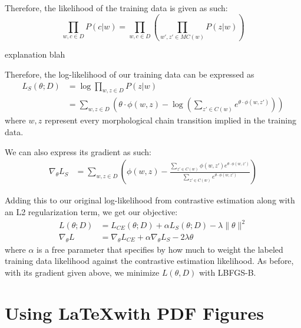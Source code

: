 \documentclass[10pt,twocolumn]{article}
\begin{document}
Therefore, the likelihood of the training data is given as such:
\begin{equation}
    \prod_{w, c \in D} P(c | w) = \prod_{w, c \in D}\left(\prod_{w', z' \in MC(w)} P(z | w)\right)
\end{equation}

explanation blah

Therefore, the log-likelihood of our training data can be expressed as
\begin{equation}
    \begin{split}
        L_S(\theta; D) &= \log{\prod_{w, z \in D} P(z|w)} \\
                     &= \sum_{w, z \in D} \left(\theta \cdot \phi(w, z) - \log\left(\sum_{z' \in C(w)} e^{\theta \cdot \phi(w, z')} \right)\right)
\end{split}
\end{equation}
where $w, z$ represent every morphological chain transition implied in the training data.

We can also express its gradient as such:
\begin{equation}
    \begin{split}
        \nabla_\theta L_S &= \sum_{w, z \in D} \left(\phi(w, z) - \frac{\sum_{z' \in C(w)} \phi(w, z') e^{\theta \cdot \phi(w, z')} }{\sum_{z' \in C(w)} e^{\theta \cdot \phi(w, z')}}\right)
    \end{split}
\end{equation}

Adding this to our original log-likelihood from contrastive estimation
along with an L2 regularization term, we get our objective:
\begin{equation}
    \begin{split}
        L(\theta; D) &= L_{CE}(\theta; D) + \alpha L_S(\theta; D) - \lambda \| \theta \|^2 \\
        \nabla_\theta L &= \nabla_\theta L_{CE} + \alpha \nabla_\theta L_S - 2\lambda \theta
    \end{split}
\end{equation}
where $\alpha$ is a free parameter that specifies by how much to weight the labeled training data likelihood
against the contrastive estimation likelihood.
As before, with its gradient given above, we minimize $L(\theta, D)$ with LBFGS-B.


\section{Using \LaTeX with PDF Figures}
\end{document}
